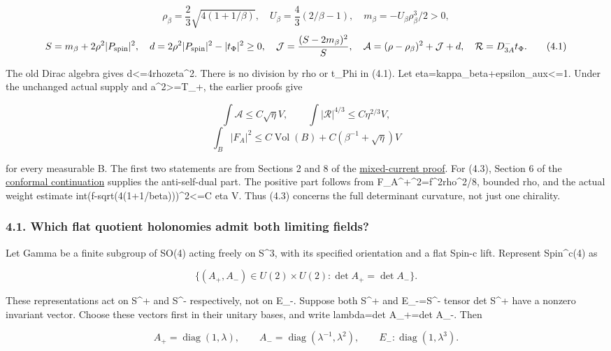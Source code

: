 \documentclass[
  10pt,
]{article}
\begin{document}
\[
 \rho_\beta=\frac23\sqrt{4(1+1/\beta)},\quad
 U_\beta=\frac43(2/\beta-1),\quad
 m_\beta=-U_\beta\rho_\beta^3/2>0,
\] \[
 S=m_\beta+2\rho^2|P_{\rm spin}|^2,\quad
 d=2\rho^2|P_{\rm spin}|^2-|t_\Phi|^2\ge0,\quad
 \mathcal J=\frac{(S-2m_\beta)^2}{S},\quad
 \mathcal A=(\rho-\rho_\beta)^2+\mathcal J+d,
 \quad \mathcal R=D^-_{3A}t_\Phi.                    \tag{4.1}
\]

The old Dirac algebra gives d\textless=4rho\textbar zeta\textbar\^{}2.
There is no division by rho or t\_Phi in (4.1). Let
eta=kappa\_beta+epsilon\_aux\textless=1. Under the unchanged actual
supply and a\^{}2\textgreater=T\_+, the earlier proofs give

\[
 \int\mathcal A\le C\sqrt\eta V,\qquad
 \int|\mathcal R|^{4/3}\le C\eta^{2/3}V,             \tag{4.2}
\] \[
 \int_B|F_A|^2\le C\operatorname{Vol}(B)
                      +C(\beta^{-1}+\sqrt\eta)V     \tag{4.3}
\]

for every measurable B. The first two statements are from Sections 2 and
8 of the \href{20260927_mixed_current_and_signed_cores.md}{mixed-current
proof}. For (4.3), Section 6 of the
\href{20260927_conformal_separation_and_zero_end.md}{conformal
continuation} supplies the anti-self-dual part. The positive part
follows from \textbar F\_A\^{}+\textbar\^{}2=f\^{}2rho\^{}2/8, bounded
rho, and the actual weight estimate
int(f-sqrt(4(1+1/beta)))\^{}2\textless=C eta V. Thus (4.3) concerns the
full determinant curvature, not just one chirality.

\hypertarget{which-flat-quotient-holonomies-admit-both-limiting-fields}{%
\subsubsection{4.1. Which flat quotient holonomies admit both limiting
fields?}\label{which-flat-quotient-holonomies-admit-both-limiting-fields}}

Let Gamma be a finite subgroup of SO(4) acting freely on S\^{}3, with
its specified orientation and a flat Spin-c lift. Represent Spin\^{}c(4)
as

\[
 \{(A_+,A_-)\in U(2)\times U(2):\det A_+=\det A_-\}.
\]

These representations act on S\^{}+ and S\^{}- respectively, not on
E\_-. Suppose both S\^{}+ and E\_-=S\^{}- tensor det S\^{}+ have a
nonzero invariant vector. Choose these vectors first in their unitary
bases, and write lambda=det A\_+=det A\_-. Then

\[
 A_+=\operatorname{diag}(1,\lambda),\qquad
 A_-=\operatorname{diag}(\lambda^{-1},\lambda^2),
 \qquad E_-:\operatorname{diag}(1,\lambda^3).        \tag{4.4}
\]
\end{document}
